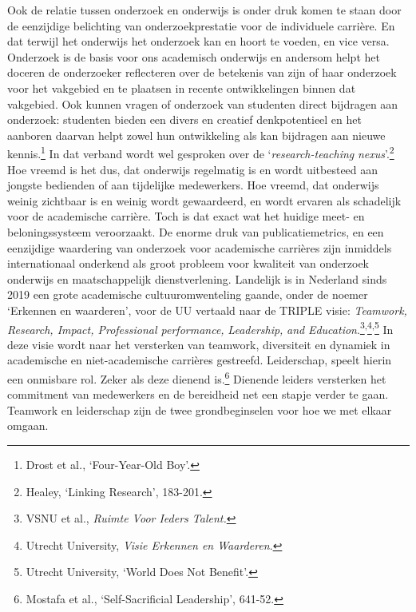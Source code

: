 \documentclass[smallauthor, chapterhaspagenum, nochapterinheader, pagenuminheader,  bigchapnum,medium2, tocpages, garamond, titleinheader]{jote-book}
\begin{document}
	Ook de relatie tussen onderzoek en onderwijs is onder druk komen te staan door de eenzijdige belichting van onderzoekprestatie voor de individuele carrière. En dat terwijl het onderwijs het onderzoek kan en hoort te voeden, en vice versa. Onderzoek is de basis voor ons academisch onderwijs en andersom helpt het doceren de onderzoeker reflecteren over de betekenis van zijn of haar onderzoek voor het vakgebied en te plaatsen in recente ontwikkelingen binnen dat vakgebied. Ook kunnen vragen of onderzoek van studenten direct bijdragen aan onderzoek: studenten bieden een divers en creatief denkpotentieel en het aanboren daarvan helpt zowel hun ontwikkeling als kan bijdragen aan nieuwe kennis.\footnote{Drost et al\emph{.}, ‘Four-Year-Old Boy'.} In dat verband wordt wel gesproken over de ‘\emph{research-teaching }\emph{nexus}'.\footnote{Healey, ‘Linking Research', 183-201.} Hoe vreemd is het dus, dat onderwijs regelmatig is en wordt uitbesteed aan jongste bedienden of aan tijdelijke medewerkers. Hoe vreemd, dat onderwijs weinig zichtbaar is en weinig wordt gewaardeerd, en wordt ervaren als schadelijk voor de academische carrière. Toch is dat exact wat het huidige meet- en beloningssysteem veroorzaakt. De enorme druk van publicatiemetrics, en een eenzijdige waardering van onderzoek voor academische carrières zijn inmiddels internationaal onderkend als groot probleem voor kwaliteit van onderzoek onderwijs en maatschappelijk dienstverlening. Landelijk is in Nederland sinds 2019 een grote academische cultuuromwenteling gaande, onder de noemer ‘Erkennen en waarderen', voor de UU vertaald naar de TRIPLE visie: \emph{Teamwork, Research, Impact, Professional performance, }\emph{Leadership}\emph{, }\emph{and}\emph{ }\emph{Education}.\footnote{VSNU et al., \emph{Ruimte Voor Ieders Talent}\emph{.}}\textsuperscript{,}\footnote{Utrecht University, \emph{Visie Erkennen en Waarderen}.}\textsuperscript{,}\footnote{Utrecht University, ‘World Does Not Benefit'.} In deze visie wordt naar het versterken van teamwork, diversiteit en dynamiek in academische en niet-academische carrières gestreefd. Leiderschap, speelt hierin een onmisbare rol. Zeker als deze dienend is.\footnote{Mostafa et al., ‘Self-Sacrificial Leadership', 641-52.} Dienende leiders versterken het commitment van medewerkers en de bereidheid net een stapje verder te gaan. Teamwork en leiderschap zijn de twee grondbeginselen voor hoe we met elkaar omgaan.

	\enlargethispage{-\baselineskip}\checkandfixthelayout
\end{document}
